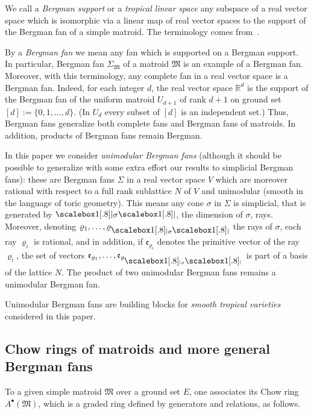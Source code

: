 \documentclass[11pt]{amsart}
\theoremstyle{definition}
\numberwithin{equation}{section}
\renewcommand{\~}{\widetilde}
\newcommand{\R}{\mathbb{R}}
\newcommand{\bul}{\bullet} %
\newcommand{\e}{{\mathfrak e}} %
\newcommand{\dimsaux}[2]{\raisebox{.2ex}{\scalebox{1}[.8]{$#1\lvert$}}#2\raisebox{.2ex}{\scalebox{1}[.8]{$#1\rvert$}}}
\newcommand{\dims}[1]{\mathpalette\dimsaux{#1}}
\newcommand{\Ma}{\mathfrak M} %
\begin{document}
\smallskip
We call a \emph{Bergman support} or a \emph{tropical linear space} any subspace of a real vector space which is isomorphic via a linear map of real vector spaces to the support of the Bergman fan of a simple matroid. The terminology comes from~\cites{Bergman, Spe08}.

\smallskip
By a \emph{Bergman fan} we mean any fan which is supported on a Bergman support. In particular, Bergman fan $\Sigma_\Ma$ of a matroid $\Ma$ is an example of a Bergman fan.
Moreover, with this terminology, any complete fan in a real vector space is a Bergman fan. Indeed, for each integer $d$, the real vector space $\R^d$ is the support of the Bergman fan of the uniform matroid $U_{d+1}$ of rank $d+1$ on ground set $[d]:=\{0, 1, \dots, d\}$. (In $U_d$ every subset of $[d]$ is an independent set.) Thus, Bergman fans generalize both complete fans and Bergman fans of matroids. In addition, products of Bergman fans remain Bergman.

\smallskip
In this paper we consider \emph{unimodular Bergman fans} (although it should be possible to generalize with some extra effort our results to simplicial Bergman fans): these are Bergman fans $\Sigma$ in a real vector space $V$ which are moreover rational with respect to a full rank sublattice $N$ of $V$ and unimodular (smooth in the language of toric geometry). This means any cone $\sigma$ in $\Sigma$ is simplicial, that is generated by $\dims{\sigma}$, the dimension of $\sigma$,  rays. Moreover, denoting $\varrho_1, \dots, \varrho_{\dims{\sigma}}$ the rays of $\sigma$, each ray $\varrho_i$ is rational, and in addition, if $\e_{\varrho_i}$ denotes the primitive vector of the ray $\varrho_i$, the set of vectors $\e_{\varrho_1}, \dots, \e_{\varrho_{\dims\sigma}}$ is part of a basis of the lattice $N$. The product of two unimodular Bergman fans remains a unimodular Bergman fan.

\smallskip
Unimodular Bergman fans are building blocks for \emph{smooth tropical varieties} considered in this paper.



\subsection{Chow rings of matroids and more general Bergman fans} To a given simple matroid $\Ma$ over a ground set $E$, one associates its Chow ring $A^\bul(\Ma)$, which is a graded ring defined by generators and relations, as follows.
\end{document}
